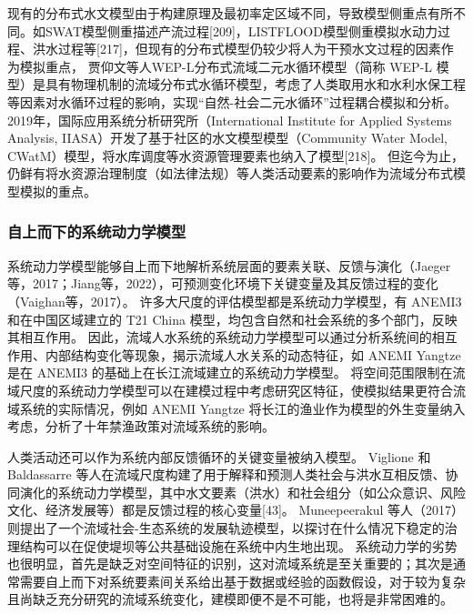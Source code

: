 现有的分布式水文模型由于构建原理及最初率定区域不同，导致模型侧重点有所不同。如SWAT模型侧重描述产流过程[209]，LISTFLOOD模型侧重模拟水动力过程、洪水过程等[217]，但现有的分布式模型仍较少将人为干预水文过程的因素作为模拟重点，
贾仰文等人WEP-L分布式流域二元水循环模型（简称 WEP-L 模型）是具有物理机制的流域分布式水循环模型，考虑了人类取用水和水利水保工程等因素对水循环过程的影响，实现“自然-社会二元水循环”过程耦合模拟和分析。 %
2019年，国际应用系统分析研究所（International Institute for Applied Systems Analysis, IIASA）开发了基于社区的水文模型模型（Community Water Model, CWatM）模型，将水库调度等水资源管理要素也纳入了模型[218]。
但迄今为止，仍鲜有将水资源治理制度（如法律法规）等人类活动要素的影响作为流域分布式模型模拟的重点。

\subsubsection*{自上而下的系统动力学模型}

系统动力学模型能够自上而下地解析系统层面的要素关联、反馈与演化（Jaeger等，2017；Jiang等，2022），可预测变化环境下关键变量及其反馈过程的变化（Vaighan等，2017）。
许多大尺度的评估模型都是系统动力学模型，有 ANEMI3 和在中国区域建立的 T21 China 模型，均包含自然和社会系统的多个部门，反映其相互作用。
因此，流域人水系统的系统动力学模型可以通过分析系统间的相互作用、内部结构变化等现象，揭示流域人水关系的动态特征，如 ANEMI Yangtze 是在 ANEMI3 的基础上在长江流域建立的系统动力学模型。
将空间范围限制在流域尺度的系统动力学模型可以在建模过程中考虑研究区特征，使模拟结果更符合流域系统的实际情况，例如 ANEMI Yangtze 将长江的渔业作为模型的外生变量纳入考虑，分析了十年禁渔政策对流域系统的影响。 %

人类活动还可以作为系统内部反馈循环的关键变量被纳入模型。
Viglione 和 Baldassarre 等人在流域尺度构建了用于解释和预测人类社会与洪水互相反馈、协同演化的系统动力学模型，其中水文要素（洪水）和社会组分（如公众意识、风险文化、经济发展等）都是反馈过程的核心变量[43]。
Muneepeerakul 等人（2017）则提出了一个流域社会-生态系统的发展轨迹模型，以探讨在什么情况下稳定的治理结构可以在促使堤坝等公共基础设施在系统中内生地出现\cite{muneepeerakul2017}。
系统动力学的劣势也很明显，首先是缺乏对空间特征的识别，这对流域系统是至关重要的；其次是通常需要自上而下对系统要素间关系给出基于数据或经验的函数假设，对于较为复杂且尚缺乏充分研究的流域系统变化，建模即便不是不可能，也将是非常困难的。

